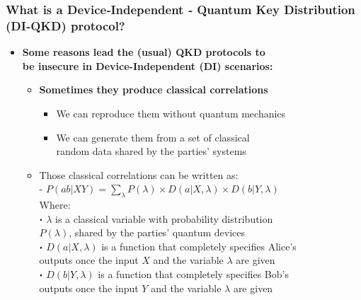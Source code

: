 \documentclass{beamer}
\newcommand\sbullet[1][.5]{\mathbin{\vcenter{\hbox{\scalebox{#1}{$\bullet$}}}}}
\begin{document}
		\begin{frame}
			\frametitle{\footnotesize What is a Device‑Independent ‑ Quantum Key Distribution (DI‑QKD) protocol?}

            \vspace{2.5ex}
            \begin{itemize}
                \item \textbf{Some reasons lead the (usual) QKD protocols to\\ be insecure in Device-Independent (DI) scenarios:}
                \begin{itemize}
                    \item \textbf{Sometimes they produce classical correlations}
                    \begin{itemize}
                        \item We can reproduce them without quantum mechanics
                        \item We can generate them from a set of classical\\ random data shared by the parties' systems
                    \end{itemize}
                    \vspace{1.5ex}
                    \item Those classical correlations can be written as:\\
                    - $P(ab|XY) = \sum_{\lambda} P(\lambda) \times D(a|X,\lambda) \times D(b|Y,\lambda)$\\
                    \vspace{0.75ex}\scriptsize
                    \hspace{1em}Where:\\
                    \hspace{0.75em}$\sbullet$ $\lambda$ is a classical variable with probability distribution\\
                    \hspace{1.15em}$P(\lambda)$, shared by the parties' quantum devices\\
                    \hspace{0.75em}$\sbullet$ $D(a|X,\lambda)$ is a function that completely specifies Alice's\\
                    \hspace{1.15em}outputs once the input $X$ and the variable $\lambda$ are given\\
                    \hspace{0.75em}$\sbullet$ $D(b|Y,\lambda)$ is a function that completely specifies Bob's\\
                    \hspace{1.15em}outputs once the input $Y$ and the variable $\lambda$ are given
                \end{itemize}
            \end{itemize}
		\end{frame}
\end{document}
